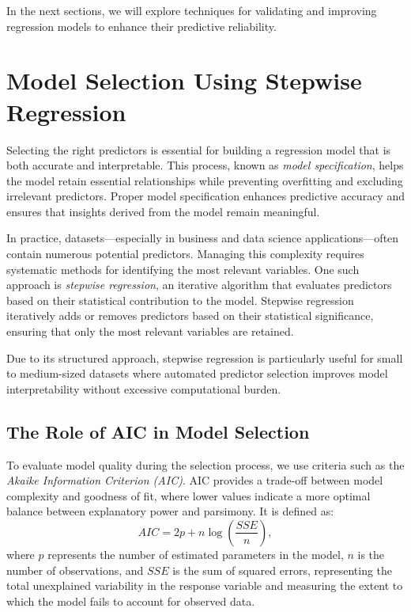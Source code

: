 \documentclass[
  11pt,
]{book}
\theoremstyle{definition}
\theoremstyle{definition}
\theoremstyle{definition}
\theoremstyle{definition}
\theoremstyle{remark}
\begin{document}
In the next sections, we will explore techniques for validating and improving regression models to enhance their predictive reliability.

\section{Model Selection Using Stepwise Regression}\label{sec-stepwise-regression}

Selecting the right predictors is essential for building a regression model that is both accurate and interpretable. This process, known as \emph{model specification}, helps the model retain essential relationships while preventing overfitting and excluding irrelevant predictors. Proper model specification enhances predictive accuracy and ensures that insights derived from the model remain meaningful.

In practice, datasets---especially in business and data science applications---often contain numerous potential predictors. Managing this complexity requires systematic methods for identifying the most relevant variables. One such approach is \emph{stepwise regression}, an iterative algorithm that evaluates predictors based on their statistical contribution to the model. Stepwise regression iteratively adds or removes predictors based on their statistical significance, ensuring that only the most relevant variables are retained.

Due to its structured approach, stepwise regression is particularly useful for small to medium-sized datasets where automated predictor selection improves model interpretability without excessive computational burden.

\subsection*{The Role of AIC in Model Selection}\label{the-role-of-aic-in-model-selection}


To evaluate model quality during the selection process, we use criteria such as the \emph{Akaike Information Criterion (AIC)}. AIC provides a trade-off between model complexity and goodness of fit, where lower values indicate a more optimal balance between explanatory power and parsimony. It is defined as:\\
\[
AIC = 2p + n \log\left(\frac{SSE}{n}\right),
\]
where \(p\) represents the number of estimated parameters in the model, \(n\) is the number of observations, and \(SSE\) is the sum of squared errors, representing the total unexplained variability in the response variable and measuring the extent to which the model fails to account for observed data.
\end{document}
